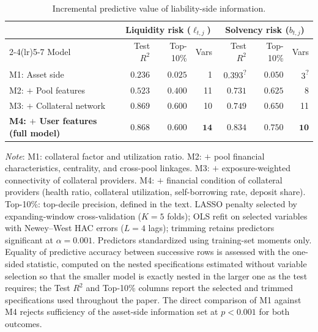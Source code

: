 \documentclass[a4paper,UKenglish,cleveref, autoref, thm-restate]{informs3}
\newcommand{\rev}[1]{{\color{purple}#1}}
\begin{document}
\FloatBarrier 
\begin{table}[ht]
\centering
\begin{threeparttable}
\caption{Incremental predictive value of liability-side
         information. }
\label{tab:incremental}
\footnotesize
\begin{tabular}{lrrrrrr}
\toprule
& \multicolumn{3}{c}{Liquidity risk ($\ell_{t,j}$)}
& \multicolumn{3}{c}{Solvency risk (\rev{$b_{t,j}$})} \\
\cmidrule(lr){2-4}\cmidrule(lr){5-7}
Model
    & Test $R^2$
    & \rev{Top-10\%}
    & Vars
    & Test $R^2$
    & \rev{Top-10\%}
    & Vars \\
\midrule
M1: Asset side
    & $0.236$ & \rev{$0.025$} & 1
    & $0.393$\rev{\textsuperscript{?}} & \rev{$0.050$} & 3\rev{\textsuperscript{?}} \\
M2: $+$ Pool features
    & $0.523$ & \rev{$0.400$} & 11
    & $0.731$ & \rev{$0.625$} & 8  \\
M3: $+$ Collateral network
    & $0.869$ & \rev{$0.600$} & 10
    & $0.749$ & \rev{$0.650$} & 11 \\
\textbf{M4: $+$ User features (full model)}
    & $\mathbf{0.868}$ & \rev{$\mathbf{0.600}$} & $\mathbf{14}$
    & $\mathbf{0.834}$ & \rev{$\mathbf{0.750}$} & $\mathbf{10}$ \\
\bottomrule
\end{tabular}
\begin{tablenotes}[flushleft]
\setlength{\itemsep}{0pt}
\setlength{\parsep}{0pt}
{\scriptsize
\item \textit{Note}: M1: collateral factor and utilization
ratio. M2: $+$ pool financial characteristics, centrality,
and cross-pool linkages. M3: $+$ exposure-weighted
connectivity of collateral providers. M4: $+$ financial
condition of collateral providers (health ratio, collateral
utilization, self-borrowing rate, deposit share).
\rev{Top-10\%: top-decile precision, defined in the text.}
LASSO
penalty selected by expanding-window cross-validation
($K = 5$ folds); OLS refit on selected variables with
Newey--West HAC errors ($L = 4$ lags); trimming retains
predictors significant at $\alpha = 0.001$. Predictors
standardized using training-set moments only.
\rev{Equality of predictive accuracy between successive rows is
assessed with the one-sided \citet{clark2007approximately}
statistic, computed on the nested specifications estimated without
variable selection so that the smaller model is exactly nested in
the larger one as the test requires; the Test $R^2$ and Top-10\%
columns report the selected and trimmed specifications used
throughout the paper. The direct comparison of M1 against M4
rejects sufficiency of the asset-side information set at
$p < 0.001$ for both outcomes.}
}
\end{tablenotes}
\end{threeparttable}
\end{table}
\end{document}
